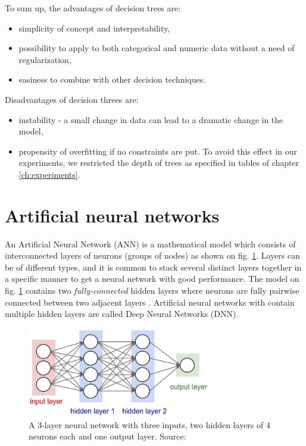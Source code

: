 To sum up, the advantages of decision trees are:
\begin{itemize}
    \item simplicity of concept and interpretability,
    \item possibility to apply to both categorical and numeric data without a need of regularization,
    \item easiness to combine with other decision techniques.
\end{itemize}

Disadvantages of decision threes are:
\begin{itemize}
    \item instability - a small change in data can lead to a dramatic change in the model,
    \item propensity of overfitting if no constraints are put. To avoid this effect in our experiments, we restricted the depth of trees as specified in tables of chapter \ref{ch:experiments}.
\end{itemize}


\section{Artificial neural networks}
An Artificial Neural Network (ANN) is a mathematical model which consists of interconnected layers of neurons (groups of nodes) as shown on fig. \ref{fig:neural-net}. Layers can be of different types, and it is common to stack several distinct layers together in a specific manner to get a neural network with good performance. The model on fig. \ref{fig:neural-net} contains two \textit{fully-connected} hidden layers where neurons are fully pairwise connected between two adjacent layers \citep{FeiFei-2016}. Artificial neural networks with contain multiple hidden layers are called Deep Neural Networks (DNN). 

\begin{figure}[h]
    \centering
    \includegraphics[width=8cm]{Images/Neural-network.jpg}
    \caption{A 3-layer neural network with three inputs, two hidden layers of 4 neurons each and one output layer. Source: \citep{FeiFei-2016}}
    \label{fig:neural-net}
\end{figure} 

